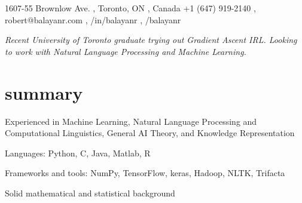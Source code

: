 \documentclass[]{cv-roald}
\begin{document}
\pagestyle{empty} %

{\faMapMarker \hspace{\FAspace} 1607-55 Brownlow Ave. \sep
Toronto, ON \sep
Canada}
{\faMobile \hspace{\FAspace} +1 (647) 919-2140 \sep
\faEnvelope \hspace{\FAspace} robert@balayanr.com \sep
\faLinkedinSquare /in/balayanr \sep%
\faGithub /balayanr %
}

\textit{Recent University of Toronto graduate trying out Gradient Ascent IRL. Looking to work with Natural Language Processing and Machine Learning.}

\section*{summary}
\begin{tabitemize}
    \item Experienced in Machine Learning, Natural Language Processing and Computational Linguistics, General AI Theory, and Knowledge Representation
    \item Languages: Python, C, Java, Matlab, R
    \item Frameworks and tools: NumPy, TensorFlow, keras, Hadoop, NLTK, Trifacta
    \item Solid mathematical and statistical background
\end{tabitemize}
\end{document}
